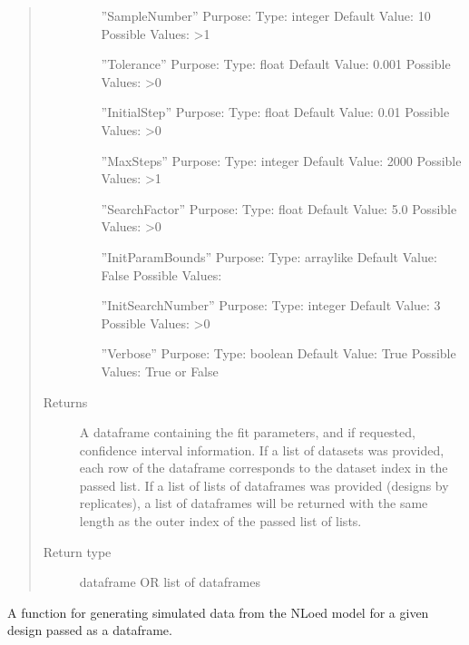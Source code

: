 \documentclass[letterpaper,10pt,english,openany,oneside]{sphinxmanual}
\begin{document}
\begin{fulllineitems}
\begin{fulllineitems}
\begin{quote}
\begin{description}
\begin{itemize}
”SampleNumber” \textendash{}
Purpose:
Type: integer
Default Value: 10
Possible Values: \textgreater{}1

”Tolerance” \textendash{}
Purpose:
Type: float
Default Value: 0.001
Possible Values: \textgreater{}0

”InitialStep” \textendash{}
Purpose:
Type: float
Default Value: 0.01
Possible Values: \textgreater{}0

”MaxSteps” \textendash{}
Purpose:
Type: integer
Default Value: 2000
Possible Values: \textgreater{}1

”SearchFactor” \textendash{}
Purpose:
Type: float
Default Value: 5.0
Possible Values: \textgreater{}0

”InitParamBounds” \textendash{}
Purpose:
Type: array\sphinxhyphen{}like
Default Value: False
Possible Values:

”InitSearchNumber” \textendash{}
Purpose:
Type: integer
Default Value: 3
Possible Values: \textgreater{}0

”Verbose” \textendash{}
Purpose:
Type: boolean
Default Value: True
Possible Values: True or False


\end{itemize}

\item[{Returns}] \leavevmode
A dataframe containing the fit parameters,
and if requested, confidence interval information. If a list of datasets was provided,
each row of the dataframe corresponds to the dataset index in the passed list.
If a list of lists of dataframes was provided (designs by replicates),
a list of dataframes will be returned with the same length as the outer index of the
passed list of lists.

\item[{Return type}] \leavevmode
dataframe OR list of dataframes

\end{description}\end{quote}

\end{fulllineitems}


\begin{fulllineitems}
\label{\detokenize{nloed:nloed.model.Model.sample}}
A function for generating simulated data from the NLoed model for a given design passed as a dataframe.


\end{fulllineitems}
\end{fulllineitems}
\end{document}

